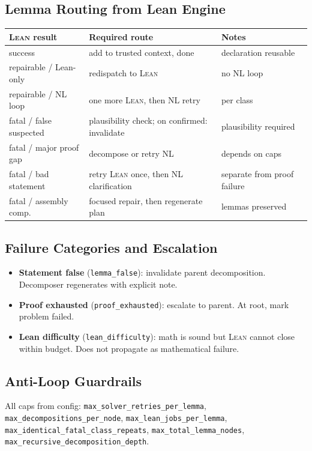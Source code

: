 \documentclass[11pt,a4paper]{article}
\newcommand{\Lean}{\textsc{Lean}}
\begin{document}
\subsection{Lemma Routing from Lean Engine}

\begin{longtable}{p{} p{} p{}}
\toprule
\Lean{} result & Required route & Notes \\
\midrule
success & add to trusted context, done & declaration reusable \\
repairable / Lean-only & redispatch to \Lean{} & no NL loop \\
repairable / NL loop & one more \Lean{}, then NL retry & per class \\
fatal / false suspected & plausibility check; on confirmed: invalidate & plausibility required \\
fatal / major proof gap & decompose or retry NL & depends on caps \\
fatal / bad statement & retry \Lean{} once, then NL clarification & separate from proof failure \\
fatal / assembly comp. & focused repair, then regenerate plan & lemmas preserved \\
\bottomrule
\end{longtable}

\subsection{Failure Categories and Escalation}

\begin{itemize}[leftmargin=2em]
  \item \textbf{Statement false} (\texttt{lemma\_false}): invalidate parent decomposition. Decomposer regenerates with explicit note.
  \item \textbf{Proof exhausted} (\texttt{proof\_exhausted}): escalate to parent. At root, mark problem failed.
  \item \textbf{Lean difficulty} (\texttt{lean\_difficulty}): math is sound but \Lean{} cannot close within budget. Does not propagate as mathematical failure.
\end{itemize}

\subsection{Anti-Loop Guardrails}
All caps from config: \texttt{max\_solver\_retries\_per\_lemma}, \texttt{max\_decompositions\_per\_node}, \texttt{max\_lean\_jobs\_per\_lemma}, \texttt{max\_identical\_fatal\_class\_repeats}, \texttt{max\_total\_lemma\_nodes}, \texttt{max\_recursive\_decomposition\_depth}.
\end{document}
